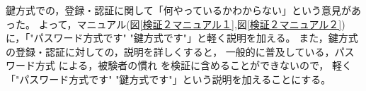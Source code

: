     鍵方式での，登録・認証に関して「何やっているかわからない」という意見があった。
    よって，マニュアル(図\ref{検証２マニュアル１},図\ref{検証２マニュアル２})に，「"パスワード方式です" "鍵方式です"」と軽く説明を加える。
    また，鍵方式の登録・認証に対しての，説明を詳しくすると，
    一般的に普及している，パスワード方式 による，被験者の慣れ を検証に含めることができないので，
    軽く「"パスワード方式です" "鍵方式です"」という説明を加えることにする。






